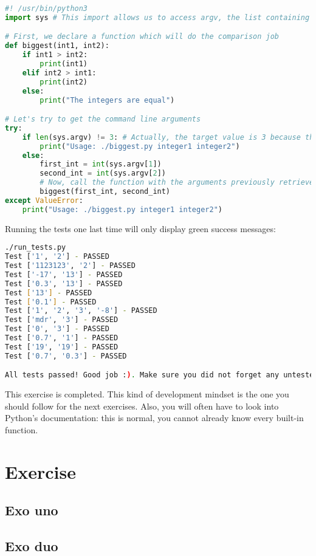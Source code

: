 \documentclass[12pt]{article}
\begin{document}
\begin{lstlisting}[style=codestyle,language=python,title=biggest.py]
#! /usr/bin/python3
import sys # This import allows us to access argv, the list containing the command line arguments

# First, we declare a function which will do the comparison job
def biggest(int1, int2):
    if int1 > int2:
        print(int1)
    elif int2 > int1:
        print(int2)
    else:
        print("The integers are equal")

# Let's try to get the command line arguments
try:
    if len(sys.argv) != 3: # Actually, the target value is 3 because the first element of argv is always the name of the script
        print("Usage: ./biggest.py integer1 integer2")
    else:
        first_int = int(sys.argv[1])
        second_int = int(sys.argv[2])
        # Now, call the function with the arguments previously retrieved
        biggest(first_int, second_int)
except ValueError:
    print("Usage: ./biggest.py integer1 integer2")
\end{lstlisting}

Running the tests one last time will only display green success messages:
\begin{lstlisting}[language=bash]
./run_tests.py 
Test ['1', '2'] - PASSED
Test ['1123123', '2'] - PASSED
Test ['-17', '13'] - PASSED
Test ['0.3', '13'] - PASSED
Test ['13'] - PASSED
Test ['0.1'] - PASSED
Test ['1', '2', '3', '-8'] - PASSED
Test ['mdr', '3'] - PASSED
Test ['0', '3'] - PASSED
Test ['0.7', '1'] - PASSED
Test ['19', '19'] - PASSED
Test ['0.7', '0.3'] - PASSED

All tests passed! Good job :). Make sure you did not forget any untested behavior
\end{lstlisting}

This exercise is completed. This kind of development mindset is the one you should follow for the next exercises. Also, you will often have to look into Python's documentation: this is normal, you cannot already know every built-in function.

\section{Exercise}
\subsection{Exo uno}
\subsection{Exo duo}
\end{document}
